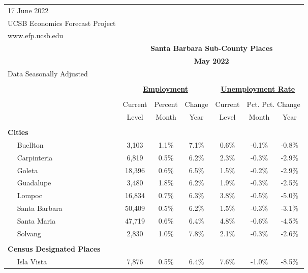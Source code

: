 \documentclass[12pt]{article}
\begin{document}
\begin{landscape}
\begin{table}
\begin{tabular}{|l|c|c|c||c|c|c|}
\multicolumn{1}{l}{\small 17 June 2022} & \multicolumn{6}{c}{} \\
\multicolumn{1}{l}{\small UCSB Economics Forecast Project} & \multicolumn{6}{c}{} \\
\multicolumn{1}{l}{\small www.efp.ucsb.edu} & \multicolumn{6}{c}{} \\
\multicolumn{1}{c}{} & \multicolumn{6}{c}{\large \textbf{Santa Barbara Sub-County Places}} \\
\multicolumn{1}{c}{} & \multicolumn{6}{c}{\large \textbf{May 2022}} \\
\multicolumn{7}{l}{\small Data Seasonally Adjusted} \\ \hline \hline
& \multicolumn{5}{c}{} & \\
& \multicolumn{3}{c}{\textbf{\underline{Employment}} } & \multicolumn{3}{c}{\textbf{\underline{Unemployment Rate}} } \vline \\
& \multicolumn{2}{c}{} & & \multicolumn{2}{c}{} & \\
& Current & \multicolumn{1}{r}{Percent} & Change & Current & \multicolumn{2}{c}{Pct. Pct. Change} \vline \\
& Level & Month & Year & Level & Month & Year \\ \hline
&&&&&& \\
\textbf{Cities} &&&&&& \\
$\quad$ Buellton & 3,103 & 1.1\% & 7.1\% & 0.6\% & -0.1\% & -0.8\% \\
$\quad$ Carpinteria & 6,819 & 0.5\% & 6.2\% & 2.3\% & -0.3\% & -2.9\% \\
$\quad$ Goleta & 18,396 & 0.6\% & 6.5\% & 1.5\% & -0.2\% & -2.9\% \\
$\quad$ Guadalupe & 3,480 & 1.8\% & 6.2\% & 1.9\% & -0.3\% & -2.5\% \\
$\quad$ Lompoc & 16,834 & 0.7\% & 6.3\% & 3.8\% & -0.5\% & -5.0\% \\
$\quad$ Santa Barbara & 50,409 & 0.5\% & 6.2\% & 1.5\% & -0.3\% & -3.1\% \\
$\quad$ Santa Maria & 47,719 & 0.6\% & 6.4\% & 4.8\% & -0.6\% & -4.5\% \\
$\quad$ Solvang & 2,830 & 1.0\% & 7.8\% & 2.1\% & -0.3\% & -2.6\% \\
&&&&&& \\
\textbf{Census Designated Places} &&&&&& \\
$\quad$ Isla Vista & 7,876 & 0.5\% & 6.4\% & 7.6\% & -1.0\% & -8.5\% \\

\end{tabular}
\end{table}
\end{landscape}
\end{document}

